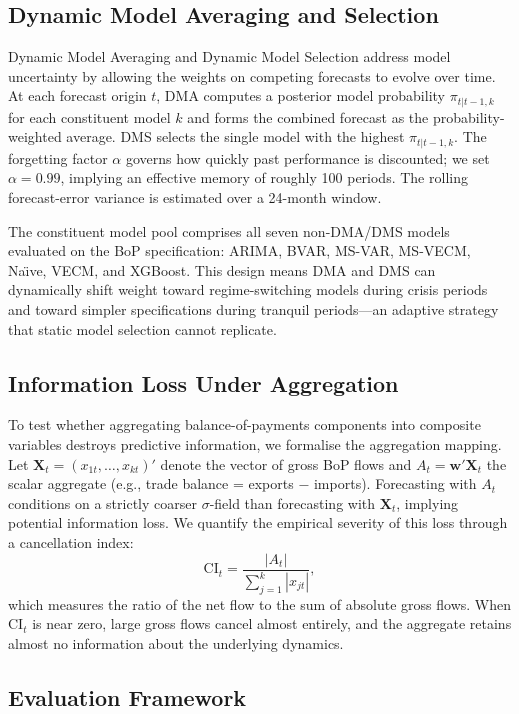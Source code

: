 \documentclass[12pt,a4paper]{article}
\begin{document}
\subsection{Dynamic Model Averaging and Selection}

Dynamic Model Averaging and Dynamic Model Selection \citep{Raftery2010,KoopKorobilis2012} address model uncertainty by allowing the weights on competing forecasts to evolve over time. At each forecast origin $t$, DMA computes a posterior model probability $\pi_{t|t-1,k}$ for each constituent model $k$ and forms the combined forecast as the probability-weighted average. DMS selects the single model with the highest $\pi_{t|t-1,k}$. The forgetting factor $\alpha$ governs how quickly past performance is discounted; we set $\alpha = 0.99$, implying an effective memory of roughly 100 periods. The rolling forecast-error variance is estimated over a 24-month window.

The constituent model pool comprises all seven non-DMA/DMS models evaluated on the BoP specification: ARIMA, BVAR, MS-VAR, MS-VECM, Na\"{\i}ve, VECM, and XGBoost. This design means DMA and DMS can dynamically shift weight toward regime-switching models during crisis periods and toward simpler specifications during tranquil periods---an adaptive strategy that static model selection cannot replicate.

\subsection{Information Loss Under Aggregation}

To test whether aggregating balance-of-payments components into composite variables destroys predictive information, we formalise the aggregation mapping. Let $\mathbf{X}_t = (x_{1t}, \ldots, x_{kt})'$ denote the vector of gross BoP flows and $A_t = \mathbf{w}'\mathbf{X}_t$ the scalar aggregate (e.g., trade balance = exports $-$ imports). Forecasting with $A_t$ conditions on a strictly coarser $\sigma$-field than forecasting with $\mathbf{X}_t$, implying potential information loss. We quantify the empirical severity of this loss through a cancellation index:
\[
\text{CI}_t = \frac{|A_t|}{\sum_{j=1}^{k} |x_{jt}|},
\]
which measures the ratio of the net flow to the sum of absolute gross flows. When $\text{CI}_t$ is near zero, large gross flows cancel almost entirely, and the aggregate retains almost no information about the underlying dynamics.

\subsection{Evaluation Framework}
\end{document}
